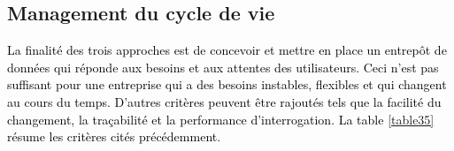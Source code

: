 \documentclass[a4paper,12pt]{report}
\begin{document}
\begin{table}[H]
	\caption{Comparaison entre les approches selon l'intégration de données et ETL}
	\label{table34}
\end{table}	

\subsection{Management du cycle de vie}
\textcolor{black}{La finalité des trois approches est de concevoir et mettre en place un entrepôt de données qui réponde aux besoins et aux attentes des utilisateurs. Ceci n’est pas suffisant pour une entreprise qui a des besoins instables, flexibles et qui changent au cours du temps. D'autres critères peuvent être rajoutés tels que la facilité du changement, la traçabilité et la performance d’interrogation. La table \ref{table35} résume les critères cités précédemment.}
\end{document}

